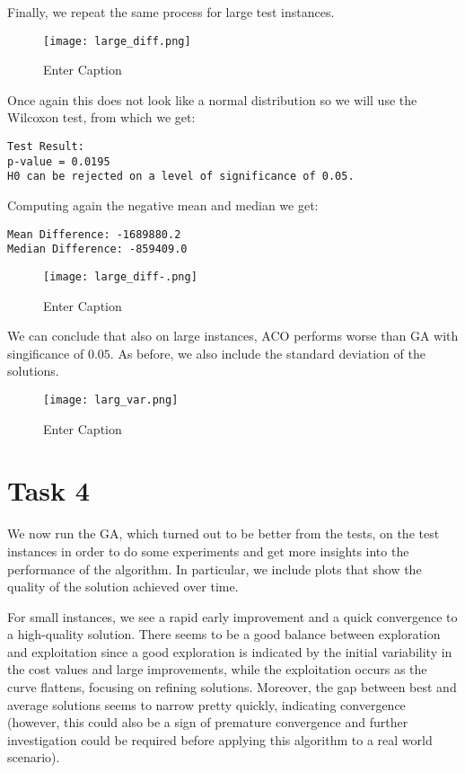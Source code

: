 \documentclass{article}
\begin{document}
Finally, we repeat the same process for large test instances.
\begin{figure}[H]
    \centering
    \texttt{[image: large\_diff.png]}
    \caption{Enter Caption}
    \label{fig:enter-label}
\end{figure}
Once again this does not look like a normal distribution so we will use the Wilcoxon test, from which we get:
\begin{verbatim}
Test Result: 
p-value = 0.0195 
H0 can be rejected on a level of significance of 0.05.  
\end{verbatim}
Computing again the negative mean and median we get:
\begin{verbatim}
Mean Difference: -1689880.2 
Median Difference: -859409.0 
\end{verbatim}
\begin{figure}[H]
    \centering
    \texttt{[image: large\_diff-.png]}
    \caption{Enter Caption}
    \label{fig:enter-label}
\end{figure}

We can conclude that also on large instances, ACO performs worse than GA with singificance of $0.05$.
As before, we also include the standard deviation of the solutions.

\begin{figure}[H]
    \centering
    \texttt{[image: larg\_var.png]}
    \caption{Enter Caption}
    \label{fig:enter-label}
\end{figure}

\section{Task 4}

We now run the GA, which turned out to be better from the tests, on the test instances in order to do some experiments and get more insights into the performance of the algorithm. In particular, we include plots that show the quality of the solution achieved over time.

For small instances, we see a rapid early improvement and a quick convergence to a high-quality solution. There seems to be a good balance between exploration and exploitation since a good exploration is indicated by the initial variability in the cost values and large improvements, while the exploitation occurs as the curve flattens, focusing on refining solutions. Moreover, the gap between best and average solutions seems to narrow pretty quickly, indicating convergence (however, this could also be a sign of premature convergence and further investigation could be required before applying this algorithm to a real world scenario).
\end{document}
